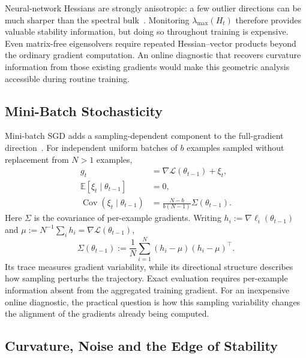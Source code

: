 Neural-network Hessians are strongly anisotropic: a few outlier directions
can be much sharper than the spectral bulk~\cite{sagun2017hessian,
ghorbani2019density}. Monitoring $\lambda_{\max}(H_t)$ therefore provides
valuable stability information, but doing so throughout training is
expensive. Even matrix-free eigensolvers require repeated Hessian--vector
products beyond the ordinary gradient computation. An online diagnostic
that recovers curvature information from those existing gradients would
make this geometric analysis accessible during routine training.

\subsection{Mini-Batch Stochasticity}

Mini-batch SGD adds a sampling-dependent component to the full-gradient
direction~\cite{mandt2017sgd, hu2019diffusion, jastrzebski2018three}.
For independent uniform batches of $b$ examples sampled without replacement
from $N>1$ examples,
\begin{equation}
\begin{aligned}
g_t&=\nabla\mathcal L(\theta_{t-1})+\xi_t,\\
\mathbb E[\xi_t\mid\theta_{t-1}]&=0,\\
\operatorname{Cov}(\xi_t\mid\theta_{t-1})
  &=\frac{N-b}{b(N-1)}\Sigma(\theta_{t-1}).
\end{aligned}
\label{eq:sgd_noise_decomposition}
\end{equation}
Here $\Sigma$ is the covariance of per-example gradients. Writing
$h_i:=\nabla\ell_i(\theta_{t-1})$ and
$\mu:=N^{-1}\sum_i h_i=\nabla\mathcal L(\theta_{t-1})$,
\begin{equation}
  \Sigma(\theta_{t-1})
  :=\frac{1}{N}\sum_{i=1}^{N}(h_i-\mu)(h_i-\mu)^\top.
  \label{eq:grad_cov_def}
\end{equation}
Its trace measures gradient variability, while its directional structure
describes how sampling perturbs the trajectory. Exact evaluation requires
per-example information absent from the aggregated training gradient.
For an inexpensive online diagnostic, the practical question is how this
sampling variability changes the alignment of the gradients already
being computed.

\subsection{Curvature, Noise and the Edge of Stability}

